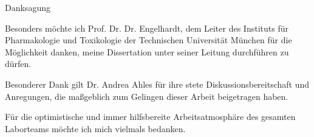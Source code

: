 \thispagestyle{empty}

\vspace*{2cm}

\begin{center}
{ Danksagung}
\end{center}

\vspace{1cm}

Besonders möchte ich Prof. Dr. Dr. Engelhardt, dem Leiter des Instituts für Pharmakologie und Toxikologie der Technischen Universität München für die Möglichkeit danken, meine Dissertation unter seiner Leitung durchführen zu dürfen. 

\vspace{2cm}

Besonderer Dank gilt Dr. Andrea Ahles für ihre stete Diskussionsbereitschaft und Anregungen, die maßgeblich zum Gelingen dieser Arbeit beigetragen haben.

\vspace{2cm}

Für die optimistische und immer hilfsbereite Arbeitsatmosphäre des gesamten Laborteams möchte ich mich vielmals bedanken.  

